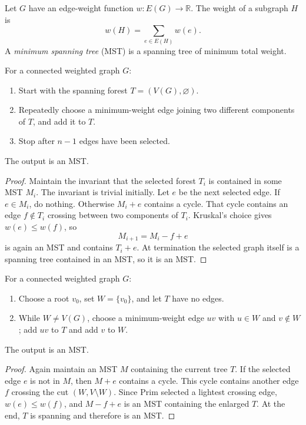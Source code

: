 \begin{notedefinition}
Let $G$ have an edge-weight function $w:E(G)\to\mathbb R$.  The weight of a subgraph $H$ is
\[
  w(H)=\sum_{e\in E(H)}w(e).
\]
A \emph{minimum spanning tree} (MST) is a spanning tree of minimum total weight.
\end{notedefinition}

\begin{notealgorithm}[Kruskal]
For a connected weighted graph $G$:
\begin{enumerate}
  \item Start with the spanning forest $T=(V(G),\varnothing)$.
  \item Repeatedly choose a minimum-weight edge joining two different components of $T$, and add it to $T$.
  \item Stop after $n-1$ edges have been selected.
\end{enumerate}
The output is an MST.
\end{notealgorithm}
\begin{proof}
Maintain the invariant that the selected forest $T_i$ is contained in some MST $M_i$.  The invariant is trivial initially.  Let $e$ be the next selected edge.  If $e\in M_i$, do nothing.  Otherwise $M_i+e$ contains a cycle.  That cycle contains an edge $f\notin T_i$ crossing between two components of $T_i$.  Kruskal's choice gives $w(e)\le w(f)$, so
\[
  M_{i+1}=M_i-f+e
\]
is again an MST and contains $T_i+e$.  At termination the selected graph itself is a spanning tree contained in an MST, so it is an MST.
\end{proof}
\begin{notealgorithm}[Prim]
For a connected weighted graph $G$:
\begin{enumerate}
  \item Choose a root $v_0$, set $W=\{v_0\}$, and let $T$ have no edges.
  \item While $W\ne V(G)$, choose a minimum-weight edge $uv$ with $u\in W$ and $v\notin W$; add $uv$ to $T$ and add $v$ to $W$.
\end{enumerate}
The output is an MST.
\end{notealgorithm}
\begin{proof}
Again maintain an MST $M$ containing the current tree $T$.  If the selected edge $e$ is not in $M$, then $M+e$ contains a cycle.  This cycle contains another edge $f$ crossing the cut $(W,V\setminus W)$.  Since Prim selected a lightest crossing edge, $w(e)\le w(f)$, and $M-f+e$ is an MST containing the enlarged $T$.  At the end, $T$ is spanning and therefore is an MST.
\end{proof}
